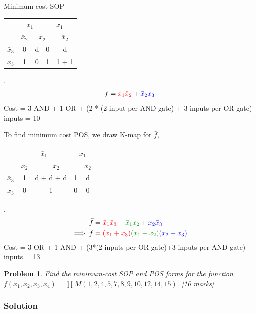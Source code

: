 \documentclass{article}
\newtheorem{prob}{Problem}
\newcommand{\bx}{\bar{x}}
\newcommand{\cred}{\color{red}}
\newcommand{\cg}{\color{green!60!black}}
\newcommand{\cb}{\color{blue}}
\begin{document}
Minimum cost SOP
\\
\begin{tabular}{c|c|c|c|c}
  \toprule
  & \multicolumn{2}{c|}{$\bx_1$} & \multicolumn{2}{c}{$x_1$}
  \\
  & $\bx_2$ & \multicolumn{2}{c|}{$x_2$} & $\bx_2$
  \\ \midrule
  $\bx_3$
                                  & 0 & d & 0 & d
  \\
  $x_3$
                                  & \cb 1 & 0 & {\cg 1} & {\cg 1} + {\cb 1}
  \\\bottomrule
\end{tabular}.
\\
\begin{align}
  f = {\cred x_1 \bx_2} + {\cb \bx_2 x_3}
\end{align}
Cost = 3 AND  + 1 OR + (2 * (2 input per AND gate) + 3 inputs per OR gate) inputs = 10

To find minimum cost POS, we draw K-map for $\bar{f}$,
\\
\begin{tabular}{c|c|c|c|c}
  \toprule
  & \multicolumn{2}{c|}{$\bx_1$} & \multicolumn{2}{c}{$x_1$}
  \\
  & $\bx_2$ & \multicolumn{2}{c|}{$x_2$} & $\bx_2$
  \\ \midrule
  $\bx_3$
  & \cred 1 & \cred d  + \cg d + \cb d & \cb 1 & d
  \\
  $x_3$
  & 0 & \cg 1 & 0 & 0
  \\\bottomrule
\end{tabular}.
\\
\begin{align}
  \bar{f} &= {\cred \bx_1 \bx_3 } + {\cg \bx_1 x_2 } + {\cb x_2 \bx_3}
  \\
  \implies f &= {\cred (x_1 + x_3)}{\cg (x_1 + \bx_2) } {\cb (\bx_2 + x_3)}
\end{align}
Cost = 3 OR + 1 AND + (3*(2 inputs per OR gate)+3 inputs per AND gate) inputs = 13

\begin{prob}
Find the minimum-cost SOP and POS forms for the function $f(x_1 , x_2 , x_3,
x_4) = \prod M(1, 2, 4, 5, 7, 8, 9, 10, 12, 14, 15).$ \cite[Prob
2.39]{brown2013fundamentals} [10 marks]
\end{prob}

\subsubsection*{Solution}
\end{document}
